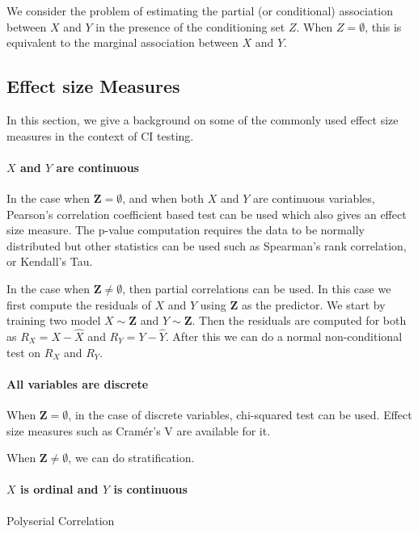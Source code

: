 \documentclass[letterpaper]{article} %
\begin{document}
We consider the problem of estimating the partial (or conditional) association
between $ X $ and $ Y $ in the presence of the conditioning set $ Z $. When $ Z
= \emptyset $, this is equivalent to the marginal association between $ X $ and
$ Y $.


\subsection{Effect size Measures}
In this section, we give a background on some of the commonly used effect size
measures in the context of CI testing.

\paragraph{$ X $ and $ Y $ are continuous}
In the case when $ \bm{Z} = \emptyset $, and when both $ X $ and $ Y $ are
continuous variables, Pearson's correlation coefficient based test can be used
which also gives an effect size measure. The p-value computation requires the
data to be normally distributed but other statistics can be used such as
Spearman's rank correlation, or Kendall's Tau.

In the case when $ \bm{Z} \neq \emptyset $, then partial correlations can be used.
In this case we first compute the residuals of $ X $ and $ Y $ using $ \bm{Z} $ as 
the predictor. We start by training two model $ X \sim \bm{Z} $ and $ Y \sim \bm{Z} $.
Then the residuals are computed for both as $ R_X = X - \hat{X} $ and $ R_Y = Y - \hat{Y} $.
After this we can do a normal non-conditional test on $ R_X $ and $ R_Y $.

\paragraph{All variables are discrete}

When $ \bm{Z} = \emptyset $, in the case of discrete variables, chi-squared test can be used. Effect size 
measures such as Cram\'er's V are available for it.

When $ \bm{Z} \neq \emptyset $, we can do stratification.


\paragraph{$ X $ is ordinal and $ Y $ is continuous}
Polyserial Correlation
\end{document}
